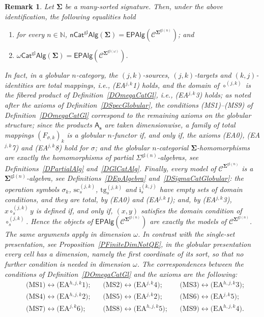 \documentclass[a4paper, reqno
]{amsart}
\newcommand{\sig}[1]{\mathbf{#1}}             %
\newcommand{\spec}[1]{\boldsymbol{\mathcal{#1}}} %
\newcommand{\gl}{\mathrm{gl}}                %
\newcommand{\src}{\mathrm{sc}}
\newcommand{\tgt}{\mathrm{tg}}
\theoremstyle{plain}
\newtheorem{remark}[theorem]{Remark}
\theoremstyle{definition}
\begin{document}
\begin{remark}\label{RGlobularIdent}
Let $\sig{\Sigma}$ be a many-sorted signature.
Then, under the above identification, the following equalities hold
\begin{enumerate}
	\item
	for every $n \in \mathbb{N}$, $\mathsf{nCat}^{\gl}\mathsf{Alg}(\sig{\Sigma})=\mathsf{EPAlg}(\spec{C}^{\sig{\Sigma}^{\gl(n)}})$; and

	\item
	$\omega\mathsf{Cat}^{\gl}\mathsf{Alg}(\sig{\Sigma})=\mathsf{EPAlg}(\spec{C}^{\sig{\Sigma}^{\gl(\omega)}})$.
\end{enumerate}
In fact, in a globular $n$-category, the $(j,k)$-sources, $(j,k)$-targets and $(k,j)$-identities are total mappings, i.e., (EA$^{j,k}$1) holds, and the domain of $\circ^{(j,k)}$ is the fibered product of Definition~\ref{DOmegaCatGl}, i.e., (EA$^{j,k}$3) holds; as noted after the axioms of Definition~\ref{DSpecGlobular}, the conditions (MS1)--(MS9) of Definition~\ref{DOmegaCatGl} correspond to the remaining axioms on the globular structure; since the products $\mathsf{A}_{\mathbf{s}}$ are taken dimensionwise, a family of total mappings $(F_{\sigma,k})_{k}$ is a globular $n$-functor if, and only if, the axioms (EA0), (EA$^{j,k}$7) and (EA$^{j,k}$8) hold for $\sigma$; and the globular $n$-categorial $\sig{\Sigma}$-homomorphisms are exactly the homomorphisms of partial $\Sigma^{\gl(n)}$-algebras, see Definitions~\ref{DPartialAlg} and~\ref{DGlCatAlg}.
Finally, every model of $\spec{C}^{\sig{\Sigma}^{\gl(n)}}$ is a $\sig{\Sigma}^{\gl(n)}$-algebra, see Definitions~\ref{DEpAlgebra} and~\ref{DSigmaCatGlobular}: the operation symbols $\sigma_{k}$, $\src^{(j,k)}_{s}$, $\tgt^{(j,k)}_{s}$ and $\mathrm{i}^{(k,j)}_{s}$ have empty sets of domain conditions, and they are total, by (EA0) and (EA$^{j,k}$1); and, by (EA$^{j,k}$3), $x\circ^{(j,k)}_{s}y$ is defined if, and only if, $(x,y)$ satisfies the domain condition of $\circ^{(j,k)}_{s}$.
Hence the objects of $\mathsf{EPAlg}(\spec{C}^{\sig{\Sigma}^{\gl(n)}})$ are exactly the models of $\spec{C}^{\sig{\Sigma}^{\gl(n)}}$.
The same arguments apply in dimension $\omega$.
In contrast with the single-set presentation, see Proposition~\ref{PFiniteDimNotQE}, in the globular presentation every cell has a dimension, namely the first coordinate of its sort, so that no further condition is needed in dimension $\omega$.
The correspondences between the conditions of Definition~\ref{DOmegaCatGl} and the axioms are the following:
\begin{align*}
&\text{(MS1)}\leftrightarrow\text{(EA$^{h,j,k}$1)};
&&\text{(MS2)}\leftrightarrow\text{(EA$^{j,k}$4)};
&&\text{(MS3)}\leftrightarrow\text{(EA$^{h,j,k}$3)};
\\
&\text{(MS4)}\leftrightarrow\text{(EA$^{h,j,k}$2)};
&&\text{(MS5)}\leftrightarrow\text{(EA$^{j,k}$2)};
&&\text{(MS6)}\leftrightarrow\text{(EA$^{j,k}$5)};
\\
&\text{(MS7)}\leftrightarrow\text{(EA$^{j,k}$6)};
&&\text{(MS8)}\leftrightarrow\text{(EA$^{h,j,k}$5)};
&&\text{(MS9)}\leftrightarrow\text{(EA$^{h,j,k}$4)}.
\end{align*}
\end{remark}
\end{document}

